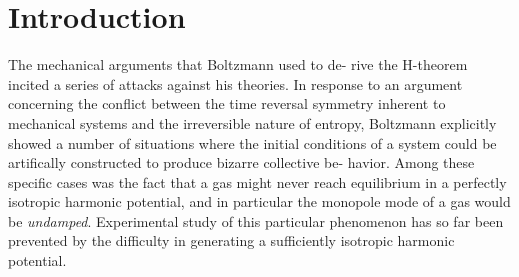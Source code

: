 \documentclass[%
 reprint,
 amsmath,amssymb,
 aps,
]{revtex4-1}
\begin{document}

\section{\label{sec:level1} Introduction}


The mechanical arguments that Boltzmann used to de- rive the H-theorem incited a series of attacks against his theories.
In response to an argument concerning the conflict between the time reversal symmetry inherent to mechanical systems and the irreversible nature of entropy, Boltzmann explicitly showed a number of situations where the initial conditions of a system could be artifically constructed to produce bizarre collective be- havior.
Among these specific cases was the fact that a gas might never reach equilibrium in a perfectly isotropic harmonic potential, and in particular the monopole mode of a gas would be \textit{undamped}.
Experimental study of this particular phenomenon has so far been prevented by the difficulty in generating a sufficiently isotropic harmonic potential. 
\end{document}
